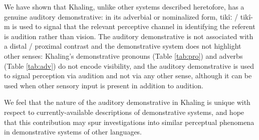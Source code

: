 \documentclass[oldfontcommands,oneside,a4paper,11pt]{article}
\newcommand{\ipa}[1]{{\phon \mbox{#1}}} %
\begin{document}
We have shown that Khaling, unlike other systems described heretofore, has a genuine auditory demonstrative: in its adverbial or nominalized form, \ipa{tikîː} / \ipa{tikî-m} is used to signal that the relevant perceptive channel in identifying the referent is audition rather than vision.  The auditory demonstrative is not associated with a distal / proximal contrast and the demonstrative system does not highlight other senses: Khaling's demonstrative pronouns (Table \ref{tab:pro}) and adverbs (Table \ref{tab:adv}) do not encode visibility, and the auditory demonstrative is used to signal perception via audition and not via any other sense, although it can be used when other sensory input is present in addition to audition.

We feel that the nature of the auditory demonstrative in Khaling is unique with respect to currently-available descriptions of demonstrative systems, and hope that this contribution may spur investigations into similar perceptual phenomena in demonstrative systems of other languages.




\end{document}
